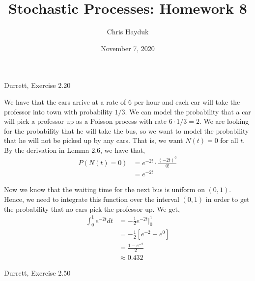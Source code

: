 \documentclass[12pt]{article}
\newenvironment{problem}[2][Problem]{\begin{trivlist}
\item[\hskip \labelsep {\bfseries #1}\hskip \labelsep {\bfseries #2.}]}{\end{trivlist}}
\begin{document}
\title{Stochastic Processes: Homework 8}

\author{Chris Hayduk}
\date{November 7, 2020}

\maketitle

\begin{problem}{1}
Durrett, Exercise 2.20
\end{problem}

We have that the cars arrive at a rate of $6$ per hour and each car will take the professor into town with probability $1/3$. We can model the probability that a car will pick a professor up as a Poisson process with rate $6 \cdot 1/3 = 2$. We are looking for the probability that he will take the bus, so we want to model the probability that he will not be picked up by any cars. That is, we want $N(t) = 0$ for all $t$. By the derivation in Lemma 2.6, we have that,
\begin{align*}
P(N(t) = 0) &= e^{-2t} \cdot \frac{(-2t)^0}{0!}\\
&= e^{-2t}
\end{align*}

Now we know that the waiting time for the next bus is uniform on $(0, 1)$. Hence, we need to integrate this function over the interval $(0, 1)$ in order to get the probability that no cars pick the professor up. We get,
\begin{align*}
\int_0^1 e^{-2t} dt &= -\frac{1}{2}e^{-2t} \Big|_0^1\\
&= -\frac{1}{2} \left[e^{-2} - e^{0} \right]\\
&= \frac{1 - e^{-2}}{2}\\
&\approx 0.432
\end{align*}

\begin{problem}{2}
Durrett, Exercise 2.50
\end{problem}
\end{document}
